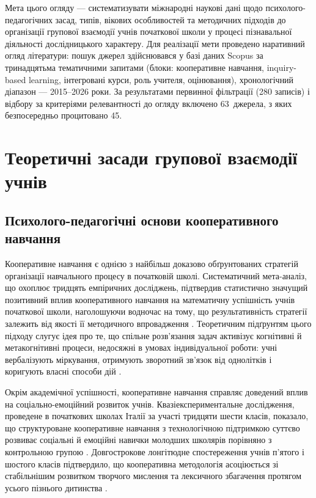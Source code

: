 \documentclass[a4paper,12pt]{article}
\begin{document}
Мета цього огляду — систематизувати міжнародні наукові дані щодо психолого-педагогічних засад, типів, вікових особливостей та методичних підходів до організації групової взаємодії учнів початкової школи у процесі пізнавальної діяльності дослідницького характеру. Для реалізації мети проведено наративний огляд літератури: пошук джерел здійснювався у базі даних Scopus за тринадцятьма тематичними запитами (блоки: кооперативне навчання, inquiry-based learning, інтегровані курси, роль учителя, оцінювання), хронологічний діапазон — 2015--2026 роки. За результатами первинної фільтрації (280 записів) і відбору за критеріями релевантності до огляду включено 63~джерела, з яких безпосередньо процитовано 45.

\newpage


\section{Теоретичні засади групової взаємодії учнів}

\subsection{Психолого-педагогічні основи кооперативного навчання}

Кооперативне навчання є однією з найбільш доказово обґрунтованих стратегій організації навчального процесу в початковій школі. Систематичний мета-аналіз, що охоплює тридцять емпіричних досліджень, підтвердив статистично значущий позитивний вплив кооперативного навчання на математичну успішність учнів початкової школи, наголошуючи водночас на тому, що результативність стратегії залежить від якості її методичного впровадження \parencite{Talkhan2025}. Теоретичним підґрунтям цього підходу слугує ідея про те, що спільне розв'язання задач активізує когнітивні й метакогнітивні процеси, недосяжні в умовах індивідуальної роботи: учні вербалізують міркування, отримують зворотний зв'язок від однолітків і коригують власні способи дій \parencite{Gu2015143}.

Окрім академічної успішності, кооперативне навчання справляє доведений вплив на соціально-емоційний розвиток учнів. Квазіекспериментальне дослідження, проведене в початкових школах Італії за участі тридцяти шести класів, показало, що структуроване кооперативне навчання з технологічною підтримкою суттєво розвиває соціальні й емоційні навички молодших школярів порівняно з контрольною групою \parencite{Zagni2025}. Довгострокове лонгітюдне спостереження учнів п'ятого і шостого класів підтвердило, що кооперативна методологія асоціюється зі стабільнішим розвитком творчого мислення та лексичного збагачення протягом усього пізнього дитинства \parencite{Segundo-Marcos2025}.
\end{document}
